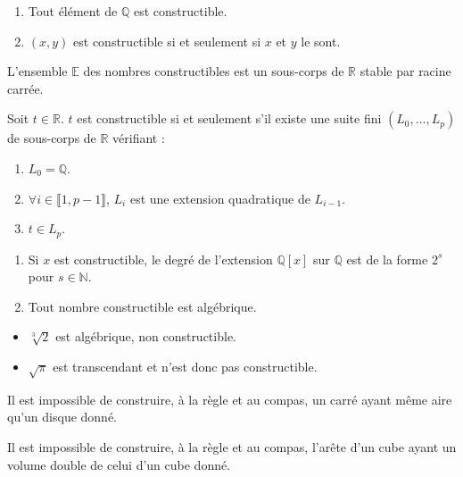 	\begin{proposition}
		\begin{enumerate}[label=(\roman*)]
			\item Tout élément de $\mathbb{Q}$ est constructible.
			\item $(x,y)$ est constructible si et seulement si $x$ et $y$ le sont.
		\end{enumerate}
	\end{proposition}

	\begin{theorem}
		L'ensemble $\mathbb{E}$ des nombres constructibles est un sous-corps de $\mathbb{R}$ stable par racine carrée.
	\end{theorem}

	\begin{theorem}[Wantzel]
		Soit $t \in \mathbb{R}$. $t$ est constructible si et seulement s'il existe une suite fini $(L_0, \dots, L_p)$ de sous-corps de $\mathbb{R}$ vérifiant :
		\begin{enumerate}[label=(\roman*)]
			\item $L_0 = \mathbb{Q}$.
			\item $\forall i \in \llbracket 1, p-1 \rrbracket$, $L_i$ est une extension quadratique de $L_{i-1}$.
			\item $t \in L_p$.
		\end{enumerate}
	\end{theorem}

	\begin{corollary}
		\begin{enumerate}[label=(\roman*)]
			\item Si $x$ est constructible, le degré de l'extension $\mathbb{Q}[x]$ sur $\mathbb{Q}$ est de la forme $2^s$ pour $s \in \mathbb{N}$.
			\item Tout nombre constructible est algébrique.
		\end{enumerate}
	\end{corollary}

	\begin{cexample}
		\begin{itemize}
			\item $\sqrt[3]{2}$ est algébrique, non constructible.
			\item $\sqrt{\pi}$ est transcendant et n'est donc pas constructible.
		\end{itemize}
	\end{cexample}

	\begin{application}
		Il est impossible de construire, à la règle et au compas, un carré ayant même aire qu'un disque donné.
	\end{application}

	\begin{application}
		Il est impossible de construire, à la règle et au compas, l'arête d'un cube ayant un volume double de celui d'un cube donné.
	\end{application}

